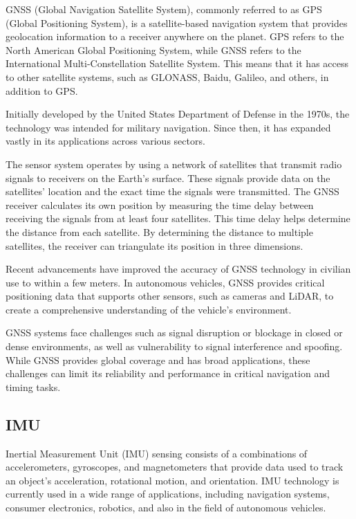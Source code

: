 GNSS (Global Navigation Satellite System), commonly referred to as GPS (Global Positioning System), is a satellite-based navigation system that provides geolocation information to a receiver anywhere on the planet. GPS refers to the North American Global Positioning System, while GNSS refers to the International Multi-Constellation Satellite System. This means that it has access to other satellite systems, such as GLONASS, Baidu, Galileo, and others, in addition to GPS.

Initially developed by the United States Department of Defense in the 1970s, the technology was intended for military navigation. Since then, it has expanded vastly in its applications across various sectors.

The sensor system operates by using a network of satellites that transmit radio signals to receivers on the Earth's surface. These signals provide data on the satellites' location and the exact time the signals were transmitted. The GNSS receiver calculates its own position by measuring the time delay between receiving the signals from at least four satellites. This time delay helps determine the distance from each satellite. By determining the distance to multiple satellites, the receiver can triangulate its position in three dimensions.

Recent advancements have improved the accuracy of GNSS technology in civilian use to within a few meters. In autonomous vehicles, GNSS provides critical positioning data that supports other sensors, such as cameras and LiDAR, to create a comprehensive understanding of the vehicle's environment.

GNSS systems face challenges such as signal disruption or blockage in closed or dense environments, as well as vulnerability to signal interference and spoofing. While GNSS provides global coverage and has broad applications, these challenges can limit its reliability and performance in critical navigation and timing tasks.

\subsection{IMU}

Inertial Measurement Unit (IMU) sensing consists of a combinations of accelerometers, gyroscopes, and magnetometers that provide data used to track an object's acceleration, rotational motion, and orientation. IMU technology is currently used in a wide range of applications, including navigation systems, consumer electronics, robotics, and also in the field of autonomous vehicles. 

